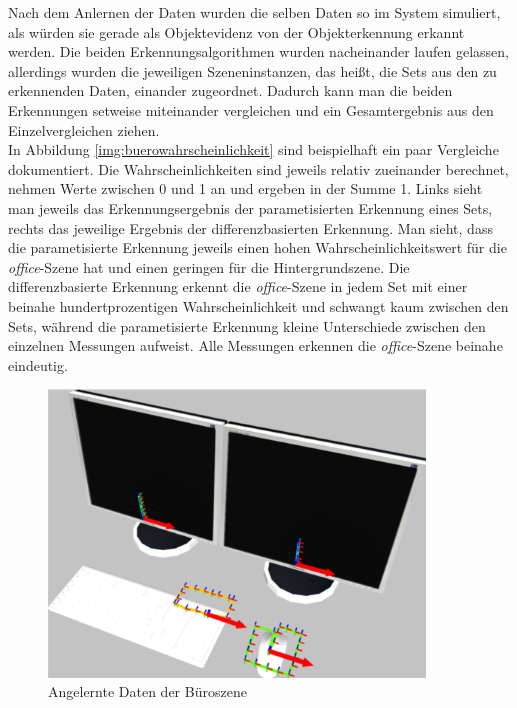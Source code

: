 Nach dem Anlernen der Daten wurden die selben Daten so im System simuliert, als würden sie gerade als Objektevidenz von der Objekterkennung erkannt werden. Die beiden Erkennungsalgorithmen wurden nacheinander laufen gelassen, allerdings wurden die jeweiligen Szeneninstanzen, das heißt, die Sets aus den zu erkennenden Daten, einander zugeordnet. Dadurch kann man die beiden Erkennungen setweise miteinander vergleichen und ein Gesamtergebnis aus den Einzelvergleichen ziehen.\smallskip\\
In Abbildung \ref{img:buerowahrscheinlichkeit} sind beispielhaft ein paar Vergleiche dokumentiert. Die Wahrscheinlichkeiten sind jeweils relativ zueinander berechnet, nehmen Werte zwischen 0 und 1 an und ergeben in der Summe 1. Links sieht man jeweils das Erkennungsergebnis der parametisierten Erkennung eines Sets, rechts das jeweilige Ergebnis der differenzbasierten Erkennung. Man sieht, dass die parametisierte Erkennung jeweils einen hohen Wahrscheinlichkeitswert für die \textit{office}-Szene hat und einen geringen für die Hintergrundszene. Die differenzbasierte Erkennung erkennt die \textit{office}-Szene in jedem Set mit einer beinahe hundertprozentigen Wahrscheinlichkeit und schwangt kaum zwischen den Sets, während die parametisierte Erkennung kleine Unterschiede zwischen den einzelnen Messungen aufweist. Alle Messungen erkennen die \textit{office}-Szene beinahe eindeutig.\smallskip\\
\begin{figure}
	\centering
	\includegraphics[width=10cm]{bilder/evaluationbueroszene.pdf}
	\caption{Angelernte Daten der B{\"u}roszene \cite{gassner17}}
	\label{img:buero}
\end{figure}
